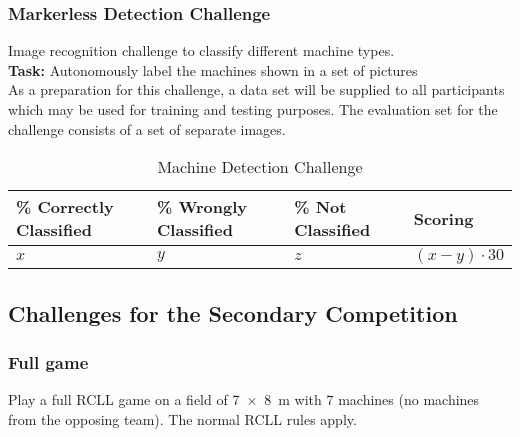 \documentclass[12pt,twoside]{article}
\newcommand{\reftab}[1]{Table~\ref{#1}}
\begin{document}


\subsubsection{Markerless Detection Challenge}\label{sec:markerless}
Image recognition challenge to classify different machine types.\\
\textbf{Task:} Autonomously label the machines shown in a set of pictures\\
As a preparation for this challenge, a data set will be supplied to
all participants which may be used for training and testing purposes.
The evaluation set for the challenge consists of a set of separate images.
\begin{table}[!htb]
 \centering
 \begin{tabularx}{\linewidth}{l|l|l|l}
  \% Correctly Classified & \% Wrongly Classified & \% Not Classified
  & Scoring \\\hline
  $x$ & $y$ & $z$ & $(x-y)\cdot30$
 \end{tabularx}
 \caption{Machine Detection Challenge}
 \label{tab:challenge-markerless}
\end{table}

\subsection{Challenges for the Secondary Competition}

\subsubsection{Full game}\label{sec:challenge-full-game}
Play a full RCLL game on a field of \SI{7 x 8}{\metre} with $7$ machines
(no machines from the opposing team). The normal RCLL rules apply.
\end{document}
